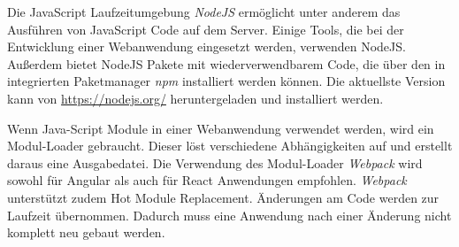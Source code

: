 \label{NodeJS}
Die JavaScript Laufzeitumgebung \textit{NodeJS} ermöglicht unter anderem das Ausführen von JavaScript Code auf dem Server. Einige Tools, die bei der Entwicklung einer Webanwendung eingesetzt werden, verwenden NodeJS. Außerdem bietet NodeJS Pakete mit wiederverwendbarem Code, die über den in integrierten Paketmanager \textit{npm} installiert werden können. Die aktuellste Version kann von \url{https://nodejs.org/} heruntergeladen und installiert werden.  \autocites[vgl.][1\psqq]{Steyer.2017}[vgl.][7\psqq]{Freeman.2018}[vgl.][6\psqq]{Woiwode.2018} 

\label{Webpack}
Wenn Java-Script Module in einer Webanwendung verwendet werden, wird ein Modul-Loader gebraucht. Dieser löst verschiedene Abhängigkeiten auf und erstellt daraus eine Ausgabedatei. Die Verwendung des Modul-Loader \textit{Webpack} wird sowohl für Angular als auch für React Anwendungen empfohlen. \textit{Webpack} unterstützt zudem Hot Module Replacement. Änderungen am Code werden zur Laufzeit übernommen. Dadurch muss eine Anwendung nach einer Änderung nicht komplett neu gebaut werden.\autocites[vgl.][13,21]{Woiwode.2018}[vgl.][9,295-301]{Zeigermann.2016}[vgl.][]{Hlushko.2018}

